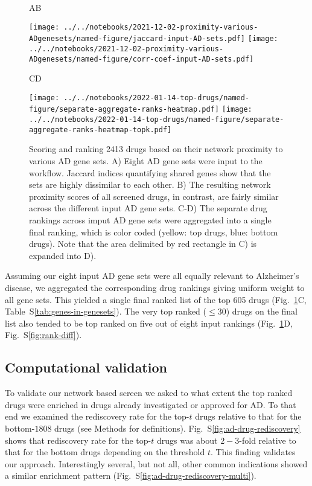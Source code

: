 \documentclass[letterpaper]{article}
\begin{document}
\begin{figure}
\hspace{0.05\textwidth}A\hspace{0.7\textwidth}B

\texttt{[image: ../../notebooks/2021-12-02-proximity-various-ADgenesets/named-figure/jaccard-input-AD-sets.pdf]}
\texttt{[image: ../../notebooks/2021-12-02-proximity-various-ADgenesets/named-figure/corr-coef-input-AD-sets.pdf]}

\hspace{0.05\textwidth}C\hspace{0.5\textwidth}D

\texttt{[image: ../../notebooks/2022-01-14-top-drugs/named-figure/separate-aggregate-ranks-heatmap.pdf]}
\texttt{[image: ../../notebooks/2022-01-14-top-drugs/named-figure/separate-aggregate-ranks-heatmap-topk.pdf]}

\caption{Scoring and ranking 2413 drugs based on their network proximity to
  various AD gene sets.  A) Eight AD gene sets were input to the workflow.
  Jaccard indices quantifying shared genes show that the sets are highly
  dissimilar to each other.  B) The resulting network proximity scores of all
  screened drugs, in contrast, are fairly similar across the different input
  AD gene sets.  C-D) The separate drug rankings across imput AD gene sets
  were aggregated into a single final ranking, which is color coded (yellow:
  top drugs, blue: bottom drugs).  Note that the area delimited by red
  rectangle in C) is expanded into D).
}
\label{fig:screen}
\end{figure}

Assuming our eight input AD gene sets were all equally relevant to Alzheimer's
disease, we aggregated the corresponding drug rankings giving uniform weight
to all gene sets.  This yielded a single final ranked list of the top 605
drugs (Fig.~\ref{fig:screen}C, Table~S\ref{tab:genes-in-genesets}).  The very top
ranked ($\le 30$) drugs on the final list also tended to be top ranked on five
out of eight input rankings (Fig.~\ref{fig:screen}D,
Fig.~S\ref{fig:rank-diff}).

\subsection{Computational validation}

To validate our network based screen we asked to what extent the top ranked
drugs were enriched in drugs already investigated or approved for AD.  To that
end we examined the rediscovery rate for the top-$t$ drugs relative to that
for the bottom-$1808$ drugs (see Methods for definitions).
Fig.~S\ref{fig:ad-drug-rediscovery} shows that rediscovery rate for the top-$t$
drugs was about $2-3$-fold relative to that for the bottom drugs depending on
the threshold $t$.  This finding validates our approach.  Interestingly several, but
not all, other common indications showed a similar enrichment pattern
(Fig.~S\ref{fig:ad-drug-rediscovery-multi}).
\end{document}
